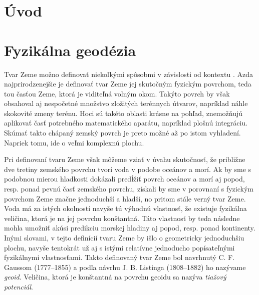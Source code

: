 \documentclass[a4paper, 12pt]{book}
\begin{document}
\tableofcontents
\newpage







\chapter*{Úvod}







\chapter{Fyzikálna geodézia}

Tvar Zeme možno definovať niekoľkými spôsobmi v závislosti od kontextu 
\citep{MoritzTheFigureOfTheEarth}.  Azda najprirodzenejšie je definovať tvar 
Zeme jej skutočným fyzickým povrchom, teda tou časťou Zeme, ktorá je viditeľná 
voľným okom.  Takýto povrch by však obsahoval aj nespočetné množstvo zložitých 
terénnych útvarov, napríklad náhle skokovité zmeny terénu.  Hoci sú takéto 
oblasti krásne na pohľad, znemožňujú aplikovať časť potrebného matematického 
aparátu, napríklad plošnú integráciu.  Skúmať takto chápaný zemský povrch je 
preto možné až po istom vyhladení.  Napriek tomu, ide o veľmi komplexnú plochu.

Pri definovaní tvaru Zeme však môžeme vziať v úvahu skutočnosť, že približne 
dve tretiny zemského povrchu tvorí voda v podobe oceánov a morí.  Ak by sme 
s podobnou mierou hladkosti dokázali predĺžiť povrch oceánov a morí aj popod, 
resp. ponad pevnú časť zemského povrchu, získali by sme v porovnaní s fyzickým 
povrchom Zeme značne jednoduchší a hladší, no pritom stále verný tvar Zeme.  
Voda má za istých okolností navyše tú výhodnú vlastnosť, že existuje fyzikálna 
veličina, ktorá je na jej povrchu konštantná.  Táto vlastnosť by teda následne 
mohla umožniť akúsi predikciu morskej hladiny aj popod, resp. ponad kontinenty.  
Inými slovami, v tejto definícií tvaru Zeme by išlo o geometricky jednoduchšiu 
plochu, navyše tentokrát už aj s istými relatívne jednoducho popísateľnými 
fyzikálnymi vlastnosťami.  Takto definovaný tvar Zeme bol navrhnutý 
C. F. Gaussom (1777--1855) a podľa návrhu J. B. Listinga (1808--1882) ho 
nazývame \emph{geoid}.  Veličina, ktorá je konštantná na povrchu geoidu sa 
nazýva \emph{tiažový potenciál}.
\end{document}
